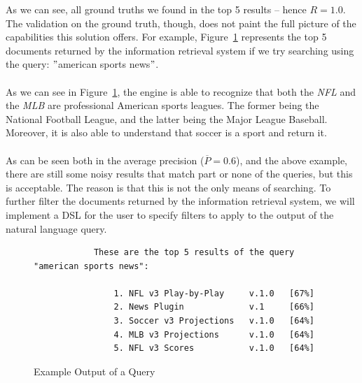 \noindent As we can see, all ground truths we found in the top 5 results -- hence $R = 1.0$.
The validation on the ground truth, though, does not paint the full picture of the capabilities this solution offers.
For example, Figure~\ref{fig:query-example} represents the top 5 documents returned by the information retrieval system if we try searching using the query: \("\)american sports news\("\). \\ \\
As we can see in Figure~\ref{fig:query-example}, the engine is able to recognize that both the \textit{NFL} and the \textit{MLB} are professional American sports leagues.
The former being the National Football League, and the latter being the Major League Baseball.
Moreover, it is also able to understand that soccer is a sport and return it. \\ \\
As can be seen both in the average precision ($\overline{P} = 0.6$), and the above example, there are still some noisy results that match part or none of the queries, but this is acceptable.
The reason is that this is not the only means of searching.
To further filter the documents returned by the information retrieval system, we will implement a DSL for the user to specify filters to apply to the output of the natural language query.

\begin{figure}[!h]
    \begin{verbatim}
            These are the top 5 results of the query "american sports news":

                1. NFL v3 Play-by-Play     v.1.0   [67%]
                2. News Plugin             v.1     [66%]
                3. Soccer v3 Projections   v.1.0   [64%]
                4. MLB v3 Projections      v.1.0   [64%]
                5. NFL v3 Scores           v.1.0   [64%]
    \end{verbatim}

    \caption{Example Output of a Query}
    \label{fig:query-example}
\end{figure}